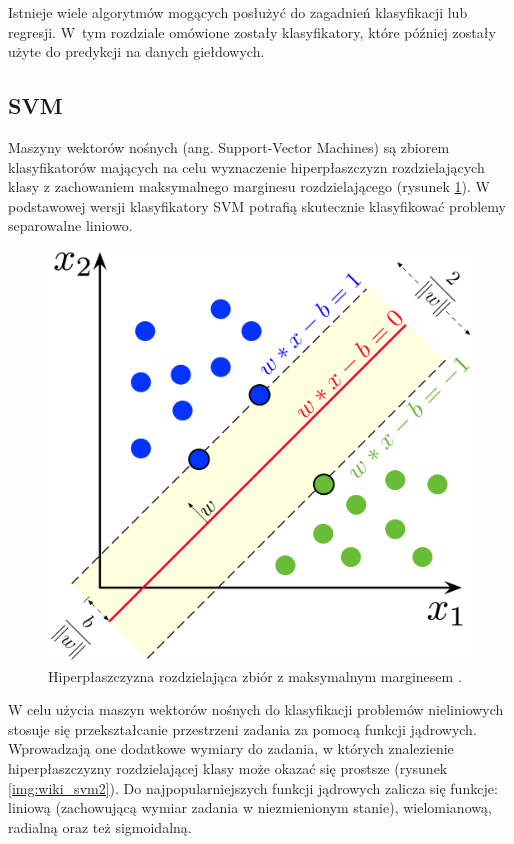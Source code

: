 \documentclass[a4paper, twoside, 11pt, openright]{article}
\begin{document}
Istnieje wiele algorytmów mogących posłużyć do zagadnień klasyfikacji lub regresji. W~tym rozdziale omówione zostały klasyfikatory, które później zostały użyte do predykcji na danych giełdowych.

\subsection{SVM}

Maszyny wektorów nośnych (ang. Support-Vector Machines)\cite{svm} są zbiorem klasyfikatorów mających na celu wyznaczenie hiperpłaszczyzn rozdzielających klasy z zachowaniem maksymalnego marginesu rozdzielającego (rysunek \ref{img:wiki_svm}). W podstawowej wersji klasyfikatory SVM potrafią skutecznie klasyfikować problemy separowalne liniowo.


\begin{figure}[H]
\centering \includegraphics[scale=0.9]{img/svm.png}
\caption{Hiperpłaszczyzna rozdzielająca zbiór z maksymalnym marginesem \cite{wikisvm}.}
\label{img:wiki_svm}
\end{figure}

W celu użycia maszyn wektorów nośnych do klasyfikacji problemów nieliniowych stosuje się przekształcanie przestrzeni zadania za pomocą funkcji jądrowych. Wprowadzają one dodatkowe wymiary do zadania, w których znalezienie hiperpłaszczyzny rozdzielającej klasy może okazać się prostsze (rysunek \ref{img:wiki_svm2}). Do najpopularniejszych funkcji jądrowych zalicza się funkcje: liniową (zachowującą wymiar zadania w niezmienionym stanie), wielomianową, radialną oraz też sigmoidalną.
\end{document}
